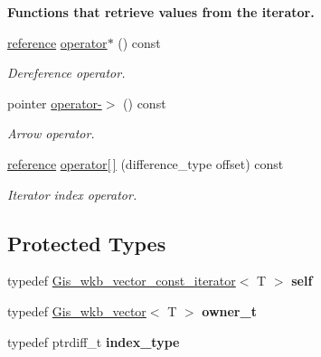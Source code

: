 \begin{Indent}\textbf{ Functions that retrieve values from the iterator.}\par
\begin{DoxyCompactItemize}
\item 
\mbox{\hyperlink{classGis__wkb__vector__const__iterator_a320ffe7a48e9c6440eb76d321ff8c5a2}{reference}} \mbox{\hyperlink{classGis__wkb__vector__const__iterator_ac11680118f26696dd591e9c5cbe1676a}{operator$\ast$}} () const
\begin{DoxyCompactList}\small\item\em Dereference operator. \end{DoxyCompactList}\item 
pointer \mbox{\hyperlink{classGis__wkb__vector__const__iterator_ab3b5df309bab51f282585f5cb92cc82f}{operator-\/$>$}} () const
\begin{DoxyCompactList}\small\item\em Arrow operator. \end{DoxyCompactList}\item 
\mbox{\hyperlink{classGis__wkb__vector__const__iterator_a320ffe7a48e9c6440eb76d321ff8c5a2}{reference}} \mbox{\hyperlink{classGis__wkb__vector__const__iterator_ad20dd8d13fb86ff0ab478ef11c400772}{operator\mbox{[}$\,$\mbox{]}}} (difference\+\_\+type offset) const
\begin{DoxyCompactList}\small\item\em Iterator index operator. \end{DoxyCompactList}\end{DoxyCompactItemize}
\end{Indent}
\subsection*{Protected Types}
\begin{DoxyCompactItemize}
\item 
\mbox{\label{classGis__wkb__vector__const__iterator_aa4d8eff23dfb021b1c7372eb7fd0f9a9}} 
typedef \mbox{\hyperlink{classGis__wkb__vector__const__iterator}{Gis\+\_\+wkb\+\_\+vector\+\_\+const\+\_\+iterator}}$<$ T $>$ {\bfseries self}
\item 
\mbox{\label{classGis__wkb__vector__const__iterator_a269d7b59168398813a5f7125b8bc33b4}} 
typedef \mbox{\hyperlink{classGis__wkb__vector}{Gis\+\_\+wkb\+\_\+vector}}$<$ T $>$ {\bfseries owner\+\_\+t}
\item 
\mbox{\label{classGis__wkb__vector__const__iterator_a76ed2220754f09261ac53cfae1467243}} 
typedef ptrdiff\+\_\+t {\bfseries index\+\_\+type}
\end{DoxyCompactItemize}
